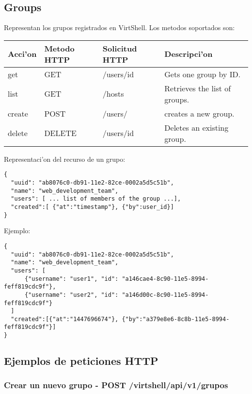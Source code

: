 \subsection{Groups}
Representan los grupos registrados en VirtShell. Los metodos soportados son:

\begin{center}
 \begin{tabular}{| l | l | l | l |}
 \hline
  \rowcolor{blueapi}
  \textbf{Acci'on} & \textbf{Metodo HTTP} & \textbf{Solicitud HTTP} & \textbf{Descripci'on} \\ [0.5ex] 
  \hline\hline
  get & GET & /users/id & Gets one group by ID. \\
  \hline
  list & GET & /hosts & Retrieves the list of groups. \\  
  \hline
  create & POST & /users/ & creates a new group. \\
  \hline
  delete & DELETE & /users/id & Deletes an existing group. \\
  \hline
\end{tabular}
\end{center}

\vspace{1cm}
Representaci'on del recurso de un grupo:
\vspace{1cm}

\begin{lstlisting}[style=json]
{
  "uuid": "ab8076c0-db91-11e2-82ce-0002a5d5c51b",
  "name": "web_development_team",
  "users": [ ... list of members of the group ...],  
  "created":[ {"at":"timestamp"}, {"by":user_id}]
}
\end{lstlisting}

Ejemplo:

\medskip
\begin{lstlisting}[style=json]
{
  "uuid": "ab8076c0-db91-11e2-82ce-0002a5d5c51b",
  "name": "web_development_team",
  "users": [ 
      {"username": "user1", "id": "a146cae4-8c90-11e5-8994-feff819cdc9f"},
      {"username": "user2", "id": "a146d00c-8c90-11e5-8994-feff819cdc9f"}
  ]
  "created":[{"at":"1447696674"}, {"by":"a379e8e6-8c8b-11e5-8994-feff819cdc9f"}]
}
\end{lstlisting}

\subsection{Ejemplos de peticiones HTTP}

\subsubsection{Crear un nuevo grupo - POST /virtshell/api/v1/grupos}

